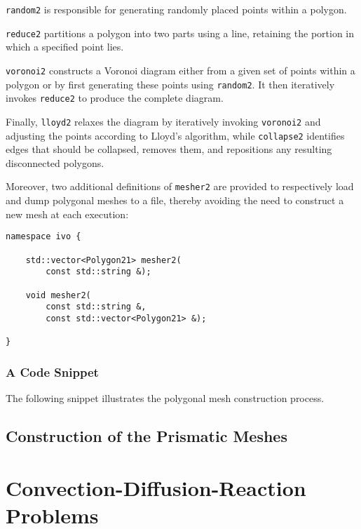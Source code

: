 \lstinline{random2} is responsible for generating randomly placed points within a polygon.

\lstinline{reduce2} partitions a polygon into two parts using a line, retaining the portion in which a specified point lies.

\lstinline{voronoi2} constructs a Voronoi diagram either from a given set of points within a polygon or by first generating these points using \lstinline{random2}. It then iteratively invokes \lstinline{reduce2} to produce the complete diagram.

Finally, \lstinline{lloyd2} relaxes the diagram by iteratively invoking \lstinline{voronoi2} and adjusting the points according to Lloyd's algorithm, while \lstinline{collapse2} identifies edges that should be collapsed, removes them, and repositions any resulting disconnected polygons.

\newpage
Moreover, two additional definitions of \lstinline{mesher2} are provided to respectively load and dump polygonal meshes to a file, thereby avoiding the need to construct a new mesh at each execution:

\begin{lstlisting}[style=cpp]
namespace ivo {

	std::vector<Polygon21> mesher2(
		const std::string &);

	void mesher2(
		const std::string &, 
		const std::vector<Polygon21> &);

}
\end{lstlisting}

\subsubsection{A Code Snippet}

The following snippet illustrates the polygonal mesh construction process.



\newpage
\subsection{Construction of the Prismatic Meshes}



\newpage
\section{Convection-Diffusion-Reaction Problems}


